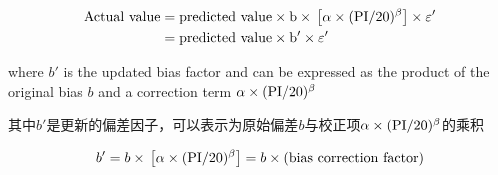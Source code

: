 \begin{align}
        \begin{split}
        \rm{Actual~value}&=\rm{predicted~value}\times{}b\times{}\left[\alpha\times{}(\rm{PI}/20)^\beta\right]\times{}\varepsilon'\\
        &=\rm{predicted~value}\times{}b'\times{}\varepsilon'
    \end{split}
    \label{equation:6}
\end{align}

\begin{paracol}{2}

    where $b'$ is the updated bias factor and can be expressed as the product of the original bias $b$ and a correction term $\alpha\times{}(\rm{PI}/20)^\beta$

    \switchcolumn

    其中$b'$是更新的偏差因子，可以表示为原始偏差$b$与校正项$\alpha\times{}(\rm{PI}/20)^\beta$的乘积
\end{paracol}

\begin{align}
    b'=b\times{}\left[\alpha\times{}(\rm{PI}/20)^\beta\right]=b\times{}(\rm{bias~correction~factor})
    \label{equation:7}
\end{align}
    
